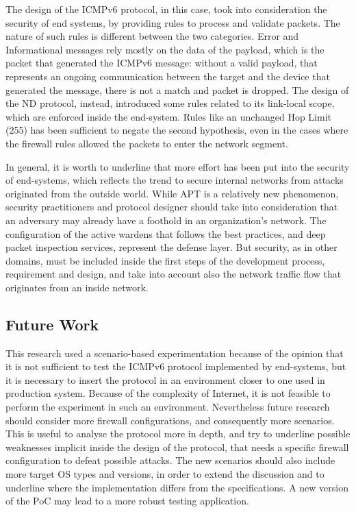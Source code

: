 \documentclass[12pt]{article}
\begin{document}
The design of the ICMPv6 protocol, in this case, took into consideration the security of end systems, by providing rules to process and validate packets. The nature of such rules is different between the two categories. Error and Informational messages rely mostly on the data of the payload, which is the packet that generated the ICMPv6 message: without a valid payload, that represents an ongoing communication between the target and the device that generated the message, there is not a match and packet is dropped. The design of the ND protocol, instead, introduced some rules related to its link-local scope, which are enforced inside the end-system. Rules like an unchanged Hop Limit (255) has been sufficient to negate the second hypothesis, even in the cases where the firewall rules allowed the packets to enter the network segment.

In general, it is worth to underline that more effort has been put into the security of end-systems, which reflects the trend to secure internal networks from attacks originated from the outside world. While APT is a relatively new phenomenon, security practitioners and protocol designer should take into consideration that an adversary may already have a foothold in an organization's network. The configuration of the active wardens that follows the best practices, and deep packet inspection services, represent the defense layer. But security, as in other domains, must be included inside the first steps of the development process, requirement and design, and take into account also the network traffic flow that originates from an inside network.

\subsection{Future Work}

This research used a scenario-based experimentation because of the opinion that it is not sufficient to test the ICMPv6 protocol implemented by end-systems, but it is necessary to insert the protocol in an environment closer to one used in production system. Because of the complexity of Internet, it is not feasible to perform the experiment in such an environment. Nevertheless future research should consider more firewall configurations, and consequently more scenarios. This is useful to analyse the protocol more in depth, and try to underline possible weaknesses implicit inside the design of the protocol, that needs a specific firewall configuration to defeat possible attacks. The new scenarios should also include more target OS types and versions, in order to extend the discussion and to underline where the implementation differs from the specifications. A new version of the PoC may lead to a more robust testing application.
\end{document}
